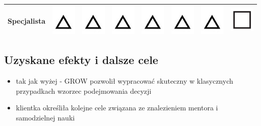 \begin{table}[!ht]
\begin{tabular}{|l|c|c|c|c|c|c|c|}
  Specjalista & \includegraphics{img/s1} & \includegraphics{img/s1} & \includegraphics{img/s1} & \includegraphics{img/s1} & \includegraphics{img/s1} & \includegraphics{img/s1} & \includegraphics{img/s2}\\ \hline
  \end{tabular}
  \caption{}
  \label{table:figureitout}
\end{table}

\subsection{Uzyskane efekty i dalsze cele}

\begin{itemize}
  \item tak jak wyżej - GROW pozwolił wypracować skuteczny w klasycznych przypadkach wzorzec podejmowania decyzji
  \item klientka określiła kolejne cele związana ze znalezieniem mentora i samodzielnej nauki
\end{itemize}

